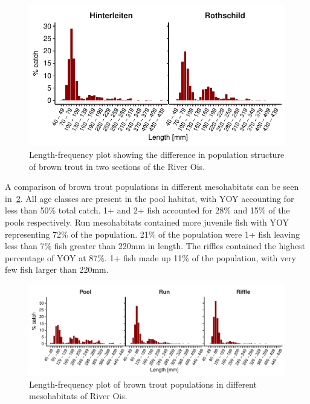 \begin{figure}[!htb]                              %
	\center
	\includegraphics{images/brown_section.pdf}                %
	\caption{Length-frequency plot showing the difference in population structure of brown trout in two sections of the River Ois.}   %
	\label{fig:brown_section}                                                       %
\end{figure}

A comparison of brown trout populations in different mesohabitats can be seen in~\cref{fig:brown_meso}. All age classes are present in the pool habitat, with YOY accounting for less than 50\% total catch. 1+ and 2+ fish accounted for 28\% and 15\% of the pools respectively. Run mesohabitats contained more juvenile fish with YOY representing 72\% of the population. 21\% of the population were 1+ fish leaving less than 7\% fish greater than 220mm in length. The riffles contained the highest percentage of YOY at 87\%. 1+ fish made up 11\% of the population, with very few fish larger than 220mm.

\begin{figure}[!htb]                              %
	\center
	\includegraphics[width=\textwidth]{images/brown_meso}                %
	\caption{Length-frequency plot of brown trout populations in different mesohabitats of River Ois.}        %
	\label{fig:brown_meso}                                                       %
\end{figure}

